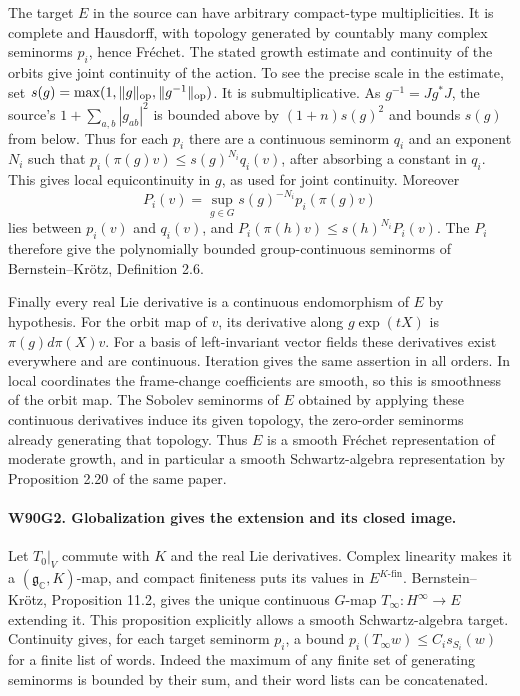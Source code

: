 The target $E$ in the source can have arbitrary compact-type
multiplicities. It is complete and Hausdorff, with topology generated
by countably many complex seminorms $p_i$, hence Fr\'echet.
The stated growth estimate and continuity of the orbits give joint
continuity of the action. To see the precise scale in the estimate,
set $s(g)=\max(1,\|g\|_{\rm op},\|g^{-1}\|_{\rm op})$. It is
submultiplicative. As $g^{-1}=Jg^*J$, the source's
$1+\sum_{a,b}|g_{ab}|^2$ is bounded above by $(1+n)s(g)^2$ and
bounds $s(g)$ from below. Thus for each $p_i$ there are a continuous
seminorm $q_i$ and an exponent $N_i$ such that
$p_i(\pi(g)v)\le s(g)^{N_i}q_i(v)$, after absorbing a constant in
$q_i$. This gives local equicontinuity in $g$, as used for joint
continuity. Moreover
\[
 P_i(v)=\sup_{g\in G}s(g)^{-N_i}p_i(\pi(g)v)
\]
lies between $p_i(v)$ and $q_i(v)$, and
$P_i(\pi(h)v)\le s(h)^{N_i}P_i(v)$. The $P_i$ therefore give
the polynomially bounded group-continuous seminorms of
Bernstein--Kr\"otz, Definition 2.6.

Finally every real Lie derivative is a continuous endomorphism of
$E$ by hypothesis. For the orbit map of $v$, its derivative along
$g\exp(tX)$ is $\pi(g)d\pi(X)v$. For a basis of left-invariant
vector fields these derivatives exist everywhere and are continuous.
Iteration gives the same assertion in all orders. In local coordinates
the frame-change coefficients are smooth, so this is smoothness of
the orbit map. The Sobolev seminorms of $E$ obtained by applying
these continuous derivatives induce its given topology, the
zero-order seminorms already generating that topology. Thus $E$ is
a smooth Fr\'echet representation of moderate growth, and in particular
a smooth Schwartz-algebra representation by Proposition 2.20 of the
same paper.

\paragraph{W90G2. Globalization gives the extension and its closed image.}
Let $T_0|_V$ commute with $K$ and the real Lie derivatives.
Complex linearity makes it a $(\mathfrak g_{\mathbb C},K)$-map,
and compact finiteness puts its values in $E^{K\text{-fin}}$.
Bernstein--Kr\"otz, Proposition 11.2, gives the unique continuous
$G$-map $T_\infty:H^\infty\to E$ extending it. This proposition
explicitly allows a smooth Schwartz-algebra target. Continuity
gives, for each target seminorm $p_i$, a bound
$p_i(T_\infty w)\le C_i s_{S_i}(w)$ for a finite list of words.
Indeed the maximum of any finite set of generating seminorms is
bounded by their sum, and their word lists can be concatenated.

